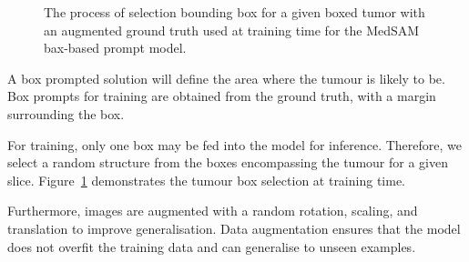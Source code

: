 \documentclass[11pt,twoside]{report}
\begin{document}
\begin{figure}
  \centering
  \caption{The process of selection bounding box for a given boxed tumor with an augmented ground truth used at training time for the MedSAM bax-based prompt model.}\label{fig:box-prompt-sam-selection}
\end{figure}

A box prompted solution will define the area where the tumour is likely to be. Box prompts for training are obtained from the ground truth, with a margin surrounding the box. 

For training, only one box may be fed into the model for inference. Therefore, we select a random structure from the boxes encompassing the tumour for a given slice. Figure~\ref{fig:box-prompt-sam-selection} demonstrates the tumour box selection at training time. 

Furthermore, images are augmented with a random rotation, scaling, and translation to improve generalisation. Data augmentation ensures that the model does not overfit the training data and can generalise to unseen examples.


\end{document}
